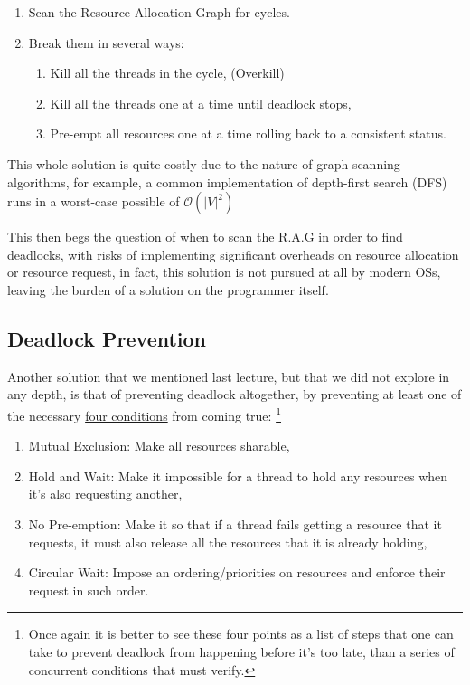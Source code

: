 \documentclass[openright, twoside]{report}
\theoremstyle{definition}
\theoremstyle{example}
\begin{document}
\begin{enumerate}
	\item Scan the Resource Allocation Graph for cycles.
	\item Break them in several ways:
	\begin{enumerate}
		\item Kill all the threads in the cycle, (Overkill)
		\item Kill all the threads one at a time until deadlock stops,
		\item Pre-empt all resources one at a time rolling back to a 
		consistent status.
	\end{enumerate}
\end{enumerate}

This whole solution is quite costly due to the nature of graph scanning algorithms, 
for example, a common implementation of depth-first search (DFS) runs in a worst-case possible 
of $\mathcal{O}(|V|^2)$

This then begs the question of when to scan the R.A.G in order to find deadlocks, with risks of 
implementing significant overheads on resource allocation or resource request, in fact, this 
solution is not pursued at all by modern OSs, leaving the burden of a solution on the programmer itself.

\subsection{Deadlock Prevention}
Another solution that we mentioned last lecture, but that we did not explore in any depth, is that 
of preventing deadlock altogether, by preventing at least one of the necessary \hyperref[ssec:deadlock_conditions]{four conditions}
from coming true: \footnote{Once again it is better to see these four points as a list of steps that one can take 
to prevent deadlock from happening before it's too late, than a series of concurrent conditions that must verify.}

\begin{enumerate}
	\item Mutual Exclusion: Make all resources sharable,
	\item Hold and Wait: Make it impossible for a thread to hold any resources when it's also requesting another,
	\item No Pre-emption: Make it so that if a thread fails getting a resource that it requests, it must also 
	release all the resources that it is already holding,
	\item Circular Wait: Impose an ordering/priorities on resources and enforce their request in such order.
\end{enumerate}
\end{document}
